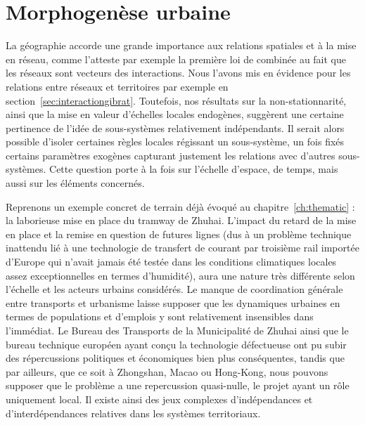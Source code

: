 



\chapter{Morphogenèse urbaine}

\label{ch:morphogenesis} %





La géographie accorde une grande importance aux relations spatiales et à la mise en réseau, comme l'atteste par exemple la première loi de  combinée au fait que les réseaux sont vecteurs des interactions. Nous l'avons mis en évidence pour les relations entre réseaux et territoires par exemple en section~\ref{sec:interactiongibrat}. Toutefois, nos résultats sur la non-stationnarité, ainsi que la mise en valeur d'échelles locales endogènes, suggèrent une certaine pertinence de l'idée de sous-systèmes relativement indépendants. Il serait alors possible d'isoler certaines règles locales régissant un sous-système, un fois fixés certains paramètres exogènes capturant justement les relations avec d'autres sous-systèmes. Cette question porte à la fois sur l'échelle d'espace, de temps, mais aussi sur les éléments concernés.

Reprenons un exemple concret de terrain déjà évoqué au chapitre~\ref{ch:thematic} : la laborieuse mise en place du tramway de Zhuhai. L'impact du retard de la mise en place et la remise en question de futures lignes (dus à un problème technique inattendu lié à une technologie de transfert de courant par troisième rail importée d'Europe qui n'avait jamais été testée dans les conditions climatiques locales assez exceptionnelles en termes d'humidité), aura une nature très différente selon l'échelle et les acteurs urbains considérés. Le manque de coordination générale entre transports et urbanisme laisse supposer que les dynamiques urbaines en termes de populations et d'emplois y sont relativement insensibles dans l'immédiat. Le Bureau des Transports de la Municipalité de Zhuhai ainsi que le bureau technique européen ayant conçu la technologie défectueuse ont pu subir des répercussions politiques et économiques bien plus conséquentes, tandis que par ailleurs, que ce soit à Zhongshan, Macao ou Hong-Kong, nous pouvons supposer que le problème a une repercussion quasi-nulle, le projet ayant un rôle uniquement local. Il existe ainsi des jeux complexes d'indépendances et d'interdépendances relatives dans les systèmes territoriaux.


